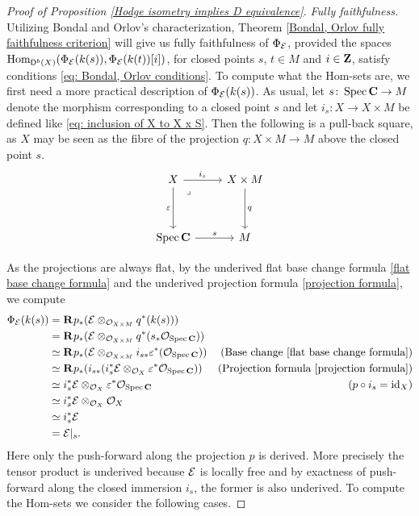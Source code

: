 \begin{proof}[Proof of Proposition \ref{Hodge isometry implies D equivalence}]
    \vspace{0.3 cm}
    \noindent
    \textsl{Fully faithfulness.} Utilizing Bondal and Orlov's characterization, Theorem \ref{Bondal, Orlov fully faithfulness criterion} will give us fully faithfulness of $\Phi_{\mathcal E}$, provided the spaces $\mathrm{Hom}_{\mathsf{D}^b(X)}(\Phi_{\mathcal E}(k(s)), \Phi_{\mathcal E}(k(t))[i])$, for closed points $s$, $t \in M$ and $i \in \mathbf Z$, satisfy conditions \eqref{eq: Bondal, Orlov conditions}. To compute what the Hom-sets are, we first need a more practical description of $\Phi_{\mathcal E}(k(s))$. As usual, let $s \colon \operatorname{Spec}\mathbf C \to M$ denote the morphism corresponding to a closed point $s$ and let $i_s \colon X \to X \times M$ be defined like \eqref{eq: inclusion of X to X x S}. Then the following is a pull-back square, as $X$ may be seen as the fibre of the projection $q \colon X \times M \to M$ above the closed point $s$.
    \[\begin{tikzcd}[column sep = small, row sep = 1.8em]
        X && X \times M \\
        \\
        \spec{\C} && M
        \arrow["{i_s}", from=1-1, to=1-3]
        \arrow["{\varepsilon}"', from=1-1, to=3-1]
        \arrow["\lrcorner"{anchor=center, pos=0.125}, draw=none, from=1-1, to=3-3]
        \arrow["{q}", from=1-3, to=3-3]
        \arrow["{s}", from=3-1, to=3-3]
    \end{tikzcd}\]

    As the projections are always flat, by the underived flat base change formula \ref{flat base change formula} and the underived projection formula \ref{projection formula}, we compute
    \begin{align*}
        \Phi_{\mathcal E}(k(s)) 
        &= \mathbf{R}^{}p_*(\mathcal E \otimes_{{\mathcal{O}_{X \times M}}} q^*(k(s))) \\
        & = \mathbf{R}^{}p_*(\mathcal E \otimes_{{\mathcal{O}_{X \times M}}} q^*(s_*{\mathcal{O}_{\operatorname{Spec}\mathbf C}})) \\
        & \simeq \mathbf{R}^{}p_*(\mathcal E \otimes_{{\mathcal{O}_{X \times M}}} i_{s*}\varepsilon^*({\mathcal{O}_{\operatorname{Spec}\mathbf C}})) &\text{(Base change \ref{flat base change formula})}\\
        & \simeq \mathbf{R}^{}p_*(i_{s*}(i_s^*\mathcal E \otimes_{{\mathcal{O}_{X}}} \varepsilon^*{\mathcal{O}_{\operatorname{Spec}\mathbf C}})) &\text{(Projection formula \ref{projection formula})}\\
        & \simeq i_s^*\mathcal E \otimes_{{\mathcal{O}_{X}}} \varepsilon^*{\mathcal{O}_{\operatorname{Spec}\mathbf C}} &\text{($p \circ i_s = \operatorname{id}_{X}$)}\\
        & \simeq i_s^*\mathcal E \otimes_{{\mathcal{O}_{X}}} {\mathcal{O}_{X}} \\
        & \simeq i_s^*\mathcal E \\
        & = \mathcal E|_s.
    \end{align*}
    Here only the push-forward along the projection $p$ is derived. More precisely the tensor product is underived because $\mathcal E$ is locally free and by exactness of push-forward along the closed immersion $i_s$, the former is also underived. To compute the Hom-sets we consider the following cases.


\end{proof}
